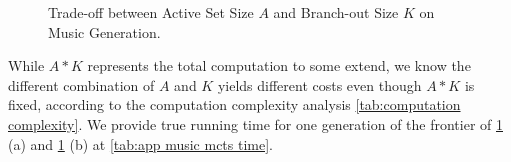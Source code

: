 \begin{figure}[ht]
    \centering
     \hspace{0.01cm}
    \hspace{0.01cm}
     \hspace{0.01cm}
    \caption{Trade-off between Active Set Size $A$ and Branch-out Size $K$ on Music Generation.}
    \label{fig:app music trade-off}
\end{figure}






While $A*K$ represents the total computation to some extend, we know the different combination of $A$ and $K$ yields different costs even though $A*K$ is fixed, according to the computation complexity analysis \cref{tab:computation complexity}. We provide true running time for one generation of the frontier of \cref{fig:app music trade-off} (a) and \cref{fig:app music trade-off} (b) at \cref{tab:app music mcts time}.


\begin{table}[H]
    \centering
    \caption{Time and Loss of the optimal $(A,K)$ with fixed $A*K$ for \xcleansampling.}
    \label{tab:app music mcts time}
\end{table}







